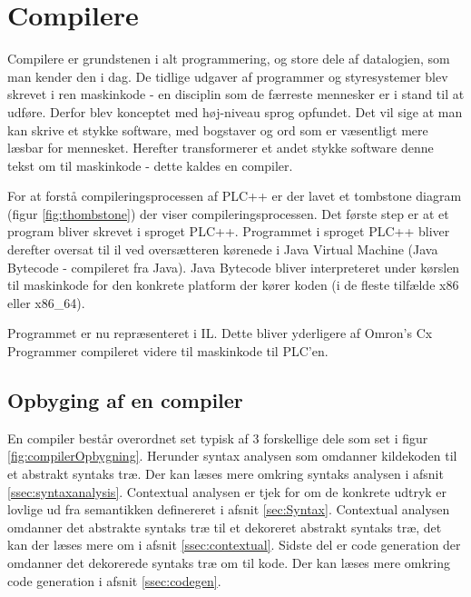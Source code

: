 \section{Compilere}
Compilere er grundstenen i alt programmering, og store dele af datalogien, som man kender den i dag. De tidlige udgaver af programmer og styresystemer blev skrevet i ren maskinkode - en disciplin som de færreste mennesker er i stand til at udføre. Derfor blev konceptet med høj-niveau sprog opfundet. Det vil sige at man kan skrive et stykke software, med bogstaver og ord som er væsentligt mere læsbar for mennesket. Herefter transformerer et andet stykke software denne tekst om til maskinkode - dette kaldes en compiler.

For at forstå compileringsprocessen af PLC++ er der lavet et tombstone diagram (figur \ref{fig:thombstone}) der viser compileringsprocessen. Det første step er at et program bliver skrevet i sproget PLC++. Programmet i sproget PLC++ bliver derefter oversat til \gls{il} ved oversætteren kørenede i Java Virtual Machine (Java Bytecode - compileret fra Java). Java Bytecode bliver interpreteret under kørslen til maskinkode for den konkrete platform der kører koden (i de fleste tilfælde x86 eller x86\_64).

\noindent Programmet er nu repræsenteret i IL. Dette bliver yderligere af Omron's Cx Programmer compileret videre til maskinkode til PLC'en.


\subsection{Opbyging af en compiler}
En compiler består overordnet set typisk af 3 forskellige dele som set i figur \ref{fig:compilerOpbygning}. Herunder syntax analysen som omdanner kildekoden til et abstrakt syntaks træ. Der kan læses mere omkring syntaks analysen i afsnit \ref{ssec:syntaxanalysis}. Contextual analysen er tjek for om de konkrete udtryk er lovlige ud fra semantikken definereret i afsnit \ref{sec:Syntax}. Contextual analysen omdanner det abstrakte syntaks træ til et dekoreret abstrakt syntaks træ, det kan der læses mere om i afsnit \ref{ssec:contextual}. Sidste del er code generation der omdanner det dekorerede syntaks træ om til kode. Der kan læses mere omkring code generation i afsnit \ref{ssec:codegen}.

